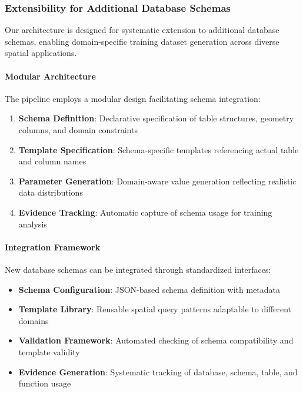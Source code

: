 \subsubsection{Extensibility for Additional Database Schemas}
\label{subsubsec:extensibility}

Our architecture is designed for systematic extension to additional database schemas, enabling domain-specific training dataset generation across diverse spatial applications.

\paragraph{Modular Architecture}
The pipeline employs a modular design facilitating schema integration:
\begin{enumerate}
    \item \textbf{Schema Definition}: Declarative specification of table structures, geometry columns, and domain constraints
    \item \textbf{Template Specification}: Schema-specific templates referencing actual table and column names
    \item \textbf{Parameter Generation}: Domain-aware value generation reflecting realistic data distributions
    \item \textbf{Evidence Tracking}: Automatic capture of schema usage for training analysis
\end{enumerate}

\paragraph{Integration Framework}
New database schemas can be integrated through standardized interfaces:
\begin{itemize}
    \item \textbf{Schema Configuration}: JSON-based schema definition with metadata
    \item \textbf{Template Library}: Reusable spatial query patterns adaptable to different domains
    \item \textbf{Validation Framework}: Automated checking of schema compatibility and template validity
    \item \textbf{Evidence Generation}: Systematic tracking of database, schema, table, and function usage
\end{itemize}

